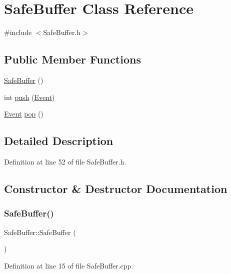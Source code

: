 \hypertarget{class_safe_buffer}{}\section{Safe\+Buffer Class Reference}
\label{class_safe_buffer}


{\ttfamily \#include $<$Safe\+Buffer.\+h$>$}

\subsection*{Public Member Functions}
\begin{DoxyCompactItemize}
\item 
\hyperlink{class_safe_buffer_af835d8d08c4dcd3326f21ae2e9988699}{Safe\+Buffer} ()
\item 
int \hyperlink{class_safe_buffer_ac3ed0799ec2e84c97e36b22c83f7abf5}{push} (\hyperlink{class_event}{Event})
\item 
\hyperlink{class_event}{Event} \hyperlink{class_safe_buffer_a90a33fca4d838f7c0eef6e8557f3c281}{pop} ()
\end{DoxyCompactItemize}


\subsection{Detailed Description}


Definition at line 52 of file Safe\+Buffer.\+h.



\subsection{Constructor \& Destructor Documentation}
\mbox{\label{class_safe_buffer_af835d8d08c4dcd3326f21ae2e9988699}} 
\subsubsection{\texorpdfstring{Safe\+Buffer()}{SafeBuffer()}}
{\footnotesize\ttfamily Safe\+Buffer\+::\+Safe\+Buffer (\begin{DoxyParamCaption}{ }\end{DoxyParamCaption})}



Definition at line 15 of file Safe\+Buffer.\+cpp.



